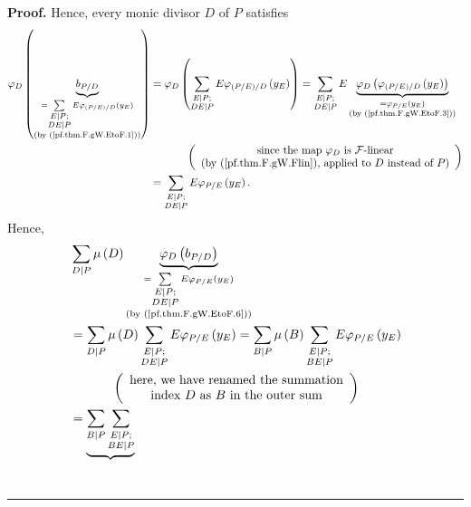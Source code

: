 \documentclass[numbers=enddot,12pt,final,onecolumn,notitlepage]{scrartcl}%
\theoremstyle{definition}
\newenvironment{proof}[1][Proof]{\noindent\textbf{#1.} }{\ \rule{0.5em}{0.5em}}
\let\sumnonlimits\sum
\renewcommand{\sum}{\sumnonlimits\limits}
\begin{document}
\begin{proof}
Hence, every monic divisor $D$ of $P$ satisfies%
\begin{align}
\varphi_{D}\left(  \underbrace{b_{P/D}}_{\substack{=\sum_{\substack{E\mid
P;\\DE\mid P}}E\varphi_{\left(  P/E\right)  /D}\left(  y_{E}\right)
\\\text{(by (\ref{pf.thm.F.gW.EtoF.1}))}}}\right)   &  =\varphi_{D}\left(
\sum_{\substack{E\mid P;\\DE\mid P}}E\varphi_{\left(  P/E\right)  /D}\left(
y_{E}\right)  \right)  =\sum_{\substack{E\mid P;\\DE\mid P}%
}E\underbrace{\varphi_{D}\left(  \varphi_{\left(  P/E\right)  /D}\left(
y_{E}\right)  \right)  }_{\substack{=\varphi_{P/E}\left(  y_{E}\right)
\\\text{(by (\ref{pf.thm.F.gW.EtoF.3}))}}}\nonumber\\
&  \ \ \ \ \ \ \ \ \ \ \left(
\begin{array}
[c]{c}%
\text{since the map }\varphi_{D}\text{ is }\mathcal{F}\text{-linear}\\
\text{(by (\ref{pf.thm.F.gW.Flin}), applied to }D\text{ instead of }P\text{)}%
\end{array}
\right) \nonumber\\
&  =\sum_{\substack{E\mid P;\\DE\mid P}}E\varphi_{P/E}\left(  y_{E}\right)  .
\label{pf.thm.F.gW.EtoF.6}%
\end{align}
Hence,%
\begin{align*}
&  \sum_{D\mid P}\mu\left(  D\right)  \underbrace{\varphi_{D}\left(
b_{P/D}\right)  }_{\substack{=\sum_{\substack{E\mid P;\\DE\mid P}%
}E\varphi_{P/E}\left(  y_{E}\right)  \\\text{(by (\ref{pf.thm.F.gW.EtoF.6}))}%
}}\\
&  =\sum_{D\mid P}\mu\left(  D\right)  \sum_{\substack{E\mid P;\\DE\mid
P}}E\varphi_{P/E}\left(  y_{E}\right)  =\sum_{B\mid P}\mu\left(  B\right)
\sum_{\substack{E\mid P;\\BE\mid P}}E\varphi_{P/E}\left(  y_{E}\right) \\
&  \ \ \ \ \ \ \ \ \ \ \left(
\begin{array}
[c]{c}%
\text{here, we have renamed the summation}\\
\text{index }D\text{ as }B\text{ in the outer sum}%
\end{array}
\right) \\
&  =\underbrace{\sum_{B\mid P}\sum_{\substack{E\mid P;\\BE\mid P}}}%

\end{align*}
\end{proof}
\end{document}
